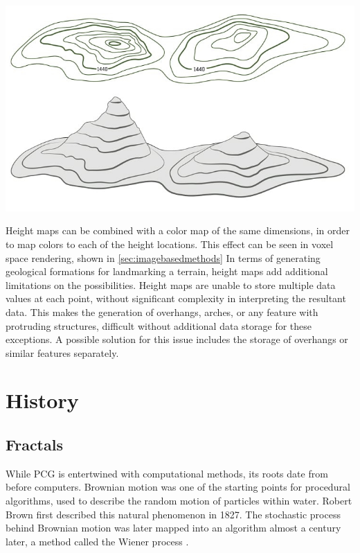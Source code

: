 \documentclass[10pt]{report}
\begin{document}
		\begin{minipage}{\textwidth}
			\centering
			\includegraphics[scale=.4]{top-map}
			\label{fig:top-map}
	\end{minipage} 
	
	Height maps can be combined with a color map of the same dimensions, in order to map colors to each of the height locations. This effect can be seen in voxel space rendering, shown in \ref{sec:imagebasedmethods} In terms of generating geological formations for landmarking a terrain, height maps add additional limitations on the possibilities. Height maps are unable to store multiple data values at each point, without significant complexity in interpreting the resultant data. This makes the generation of overhangs, arches, or any feature with protruding structures, difficult without additional data storage for these exceptions. A possible solution for this issue includes the storage of overhangs or similar features separately.
		
	\vspace{10pt}
	\let\clearpage\relax
	\chapter{History} \label{chap:development}
		
		\section{Fractals}
		While PCG is entertwined with computational methods, its roots date from before computers. Brownian motion was one of the starting points for procedural algorithms, used to describe the random motion of particles within water. Robert Brown first described this natural phenomenon in 1827. The stochastic process behind Brownian motion was later mapped into an algorithm almost a century later, a method called the Wiener process \cite{inbook}. 
		
\end{document}
